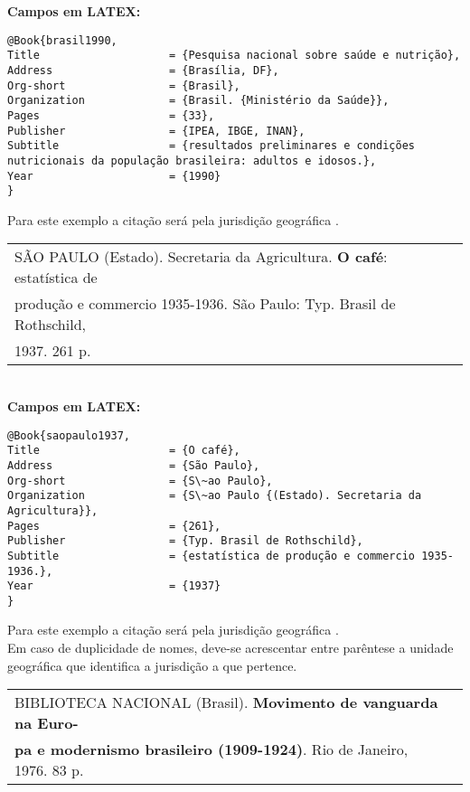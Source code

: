 \textbf{Campos em LATEX:}
	
\begingroup
\fontsize{10pt}{12pt}\selectfont
\begin{verbatim}
@Book{brasil1990,
Title                    = {Pesquisa nacional sobre saúde e nutrição},
Address                  = {Brasília, DF},
Org-short                = {Brasil},
Organization             = {Brasil. {Ministério da Saúde}},
Pages                    = {33},
Publisher                = {IPEA, IBGE, INAN},
Subtitle                 = {resultados preliminares e condições 
nutricionais da população brasileira: adultos e idosos.},
Year                     = {1990}
}
\end{verbatim}
\endgroup
	
Para este exemplo a citação será pela jurisdição geográfica \cite{brasil1990}. \\
	
\begin{tabular}{|l|c|} \hline
	SÃO PAULO (Estado). Secretaria da Agricultura. \textbf{O café}: estatística de \\produção e commercio 1935-1936. São Paulo: Typ. Brasil de Rothschild, \\1937. 261 p.  \\\hline
\end{tabular}\\
	
\textbf{Campos em LATEX:}
	
\begingroup
\fontsize{10pt}{12pt}\selectfont
\begin{verbatim}
@Book{saopaulo1937,
Title                    = {O café},
Address                  = {São Paulo},
Org-short                = {S\~ao Paulo},
Organization             = {S\~ao Paulo {(Estado). Secretaria da 
Agricultura}},
Pages                    = {261},
Publisher                = {Typ. Brasil de Rothschild},
Subtitle                 = {estatística de produção e commercio 1935-
1936.},
Year                     = {1937}
}
\end{verbatim}
\endgroup
	
Para este exemplo a citação será pela jurisdição geográfica \cite{saopaulo1937}. \\
	
Em caso de duplicidade de nomes, deve-se acrescentar entre parêntese a unidade geográfica que identifica a jurisdição a que pertence. \\
	
\begin{tabular}{|l|c|} \hline
	BIBLIOTECA NACIONAL (Brasil). \textbf{Movimento de vanguarda na Euro-} \\ \textbf{pa e modernismo brasileiro (1909-1924)}. Rio de Janeiro, 1976.	83 p.   \\\hline
\end{tabular}\\
	
